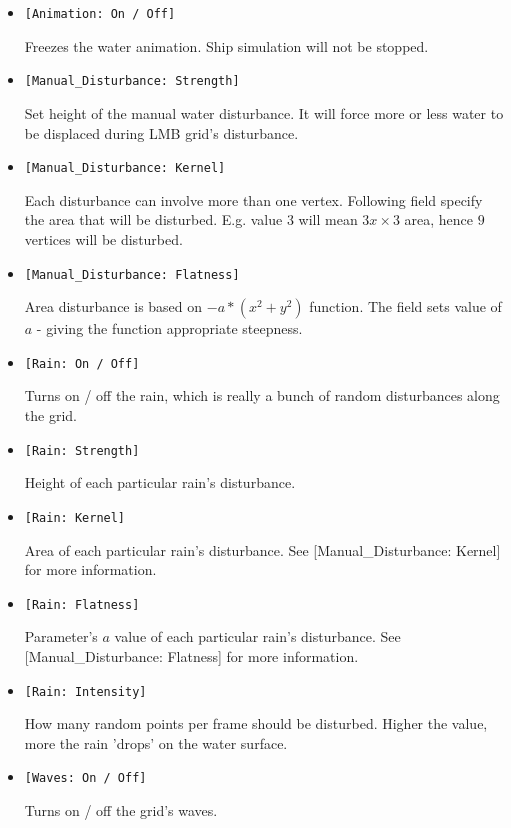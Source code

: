 \documentclass{report}
\begin{document}
\begin{itemize}
\item \texttt{[Animation: On / Off]} 

Freezes the water animation. Ship simulation will not be stopped.

\item \texttt{[Manual\_Disturbance: Strength]} 

Set height of the manual water disturbance. It will force more or less water to be displaced during LMB grid's disturbance.

\item \texttt{[Manual\_Disturbance: Kernel]} 

Each disturbance can involve more than one vertex. Following field specify the area that will be disturbed. E.g. value $3$ will mean $3x\times 3$ area, hence $9$ vertices will be disturbed.

\item \texttt{[Manual\_Disturbance: Flatness]} 

Area disturbance is based on $-a*(x^2 + y^2)$ function. The field sets value of $a$ - giving the function appropriate steepness.

\item \texttt{[Rain: On / Off]}

Turns on / off the rain, which is really a bunch of random disturbances along the grid. 

\item \texttt{[Rain: Strength]}

Height of each particular rain's disturbance. 

\item \texttt{[Rain: Kernel]}

Area of each particular rain's disturbance. See [Manual\_Disturbance: Kernel] for more information.

\item \texttt{[Rain: Flatness]}

Parameter's $a$ value of each particular rain's disturbance. See [Manual\_Disturbance: Flatness] for more information.

\item \texttt{[Rain: Intensity]}

How many random points per frame should be disturbed. Higher the value, more the rain 'drops' on the water surface.

\item \texttt{[Waves: On / Off]}

Turns on / off the grid's waves.


\end{itemize}
\end{document}

